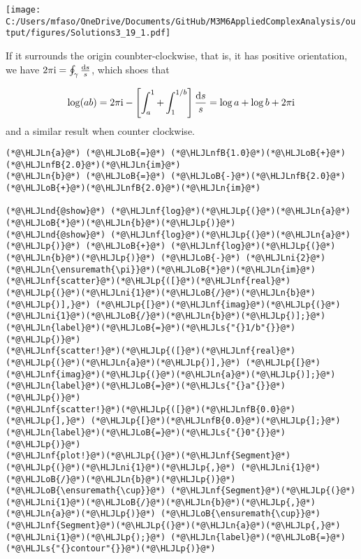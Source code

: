 \documentclass[12pt,landscape]{article}
\newcommand{\HLJLn}[1]{#1}
\newcommand{\HLJLnd}[1]{\textcolor[RGB]{214,102,97}{#1}}
\newcommand{\HLJLnf}[1]{\textcolor[RGB]{66,102,213}{#1}}
\newcommand{\HLJLs}[1]{\textcolor[RGB]{201,61,57}{#1}}
\newcommand{\HLJLnfB}[1]{\textcolor[RGB]{59,151,46}{#1}}
\newcommand{\HLJLni}[1]{\textcolor[RGB]{59,151,46}{#1}}
\newcommand{\HLJLoB}[1]{\textcolor[RGB]{102,102,102}{\textbf{#1}}}
\newcommand{\HLJLp}[1]{#1}
\def\D{ {\rm d} }
\def\I{ {\rm i} }
\begin{document}
{\texttt{[image: C:/Users/mfaso/OneDrive/Documents/GitHub/M3M6AppliedComplexAnalysis/output/figures/Solutions3\_19\_1.pdf]}

If it surrounds the origin counbter-clockwise, that is, it has positive orientation, we have $2\pi \I = \oint_\gamma {\D s \over s}$, which shoes that

\[
\log(ab) = 2 \pi \I - \left[\int_a^1 +\int_1^{1/b} \right] {\D s \over s} = \log a + \log b + 2\pi \I
\]
and a similar result when counter clockwise.


\begin{lstlisting}
(*@\HLJLn{a}@*) (*@\HLJLoB{=}@*) (*@\HLJLnfB{1.0}@*)(*@\HLJLoB{+}@*)(*@\HLJLnfB{2.0}@*)(*@\HLJLn{im}@*)
(*@\HLJLn{b}@*) (*@\HLJLoB{=}@*) (*@\HLJLoB{-}@*)(*@\HLJLnfB{2.0}@*)(*@\HLJLoB{+}@*)(*@\HLJLnfB{2.0}@*)(*@\HLJLn{im}@*)

(*@\HLJLnd{@show}@*) (*@\HLJLnf{log}@*)(*@\HLJLp{(}@*)(*@\HLJLn{a}@*)(*@\HLJLoB{*}@*)(*@\HLJLn{b}@*)(*@\HLJLp{)}@*)
(*@\HLJLnd{@show}@*) (*@\HLJLnf{log}@*)(*@\HLJLp{(}@*)(*@\HLJLn{a}@*)(*@\HLJLp{)}@*) (*@\HLJLoB{+}@*) (*@\HLJLnf{log}@*)(*@\HLJLp{(}@*)(*@\HLJLn{b}@*)(*@\HLJLp{)}@*) (*@\HLJLoB{-}@*) (*@\HLJLni{2}@*)(*@\HLJLn{\ensuremath{\pi}}@*)(*@\HLJLoB{*}@*)(*@\HLJLn{im}@*)
(*@\HLJLnf{scatter}@*)(*@\HLJLp{([}@*)(*@\HLJLnf{real}@*)(*@\HLJLp{(}@*)(*@\HLJLni{1}@*)(*@\HLJLoB{/}@*)(*@\HLJLn{b}@*)(*@\HLJLp{)],}@*) (*@\HLJLp{[}@*)(*@\HLJLnf{imag}@*)(*@\HLJLp{(}@*)(*@\HLJLni{1}@*)(*@\HLJLoB{/}@*)(*@\HLJLn{b}@*)(*@\HLJLp{)];}@*) (*@\HLJLn{label}@*)(*@\HLJLoB{=}@*)(*@\HLJLs{"{}1/b"{}}@*)(*@\HLJLp{)}@*)
(*@\HLJLnf{scatter!}@*)(*@\HLJLp{([}@*)(*@\HLJLnf{real}@*)(*@\HLJLp{(}@*)(*@\HLJLn{a}@*)(*@\HLJLp{)],}@*) (*@\HLJLp{[}@*)(*@\HLJLnf{imag}@*)(*@\HLJLp{(}@*)(*@\HLJLn{a}@*)(*@\HLJLp{)];}@*) (*@\HLJLn{label}@*)(*@\HLJLoB{=}@*)(*@\HLJLs{"{}a"{}}@*)(*@\HLJLp{)}@*)
(*@\HLJLnf{scatter!}@*)(*@\HLJLp{([}@*)(*@\HLJLnfB{0.0}@*)(*@\HLJLp{],}@*) (*@\HLJLp{[}@*)(*@\HLJLnfB{0.0}@*)(*@\HLJLp{];}@*) (*@\HLJLn{label}@*)(*@\HLJLoB{=}@*)(*@\HLJLs{"{}0"{}}@*)(*@\HLJLp{)}@*)
(*@\HLJLnf{plot!}@*)(*@\HLJLp{(}@*)(*@\HLJLnf{Segment}@*)(*@\HLJLp{(}@*)(*@\HLJLni{1}@*)(*@\HLJLp{,}@*) (*@\HLJLni{1}@*)(*@\HLJLoB{/}@*)(*@\HLJLn{b}@*)(*@\HLJLp{)}@*) (*@\HLJLoB{\ensuremath{\cup}}@*) (*@\HLJLnf{Segment}@*)(*@\HLJLp{(}@*)(*@\HLJLni{1}@*)(*@\HLJLoB{/}@*)(*@\HLJLn{b}@*)(*@\HLJLp{,}@*) (*@\HLJLn{a}@*)(*@\HLJLp{)}@*) (*@\HLJLoB{\ensuremath{\cup}}@*) (*@\HLJLnf{Segment}@*)(*@\HLJLp{(}@*)(*@\HLJLn{a}@*)(*@\HLJLp{,}@*) (*@\HLJLni{1}@*)(*@\HLJLp{);}@*) (*@\HLJLn{label}@*)(*@\HLJLoB{=}@*)(*@\HLJLs{"{}contour"{}}@*)(*@\HLJLp{)}@*)
\end{lstlisting}

}
\end{document}
